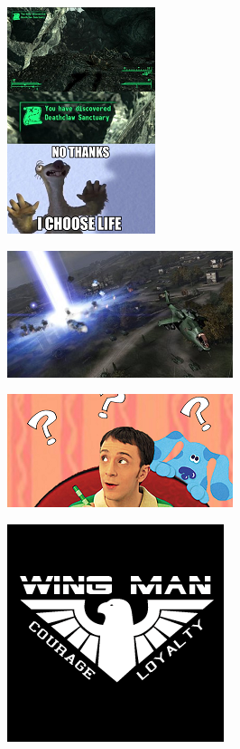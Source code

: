 \begin{figure}
	\begin{center}
		\includegraphics[width=\figwidth]{pics/6/17.png}
	\end{center}
\end{figure}

\begin{figure}
	\begin{center}
		\includegraphics[width=\figwidth]{pics/6/18.png}
	\end{center}
\end{figure}

\begin{figure}
	\begin{center}
		\includegraphics[width=\figwidth]{pics/6/19.png}
	\end{center}
\end{figure}

\begin{figure}
	\begin{center}
		\includegraphics[width=\figwidth]{pics/6/20.png}
	\end{center}
\end{figure}

